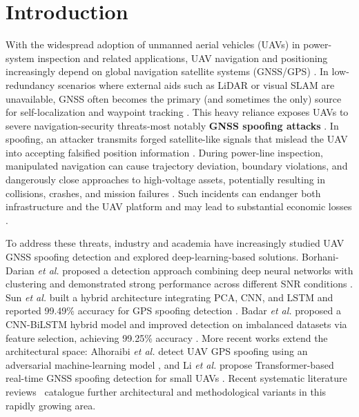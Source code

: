 \documentclass{ieeeaccess}
\begin{document}
\titlepgskip=-21pt
\maketitle

\section{Introduction}

With the widespread adoption of unmanned aerial vehicles (UAVs) in power-system inspection and related applications, UAV navigation and positioning increasingly depend on global navigation satellite systems (GNSS/GPS) \cite{ref1}. In low-redundancy scenarios where external aids such as LiDAR or visual SLAM are unavailable, GNSS often becomes the primary (and sometimes the only) source for self-localization and waypoint tracking \cite{ref2}. This heavy reliance exposes UAVs to severe navigation-security threats-most notably \textbf{GNSS spoofing attacks} \cite{ref3}. In spoofing, an attacker transmits forged satellite-like signals that mislead the UAV into accepting falsified position information \cite{ref4}. During power-line inspection, manipulated navigation can cause trajectory deviation, boundary violations, and dangerously close approaches to high-voltage assets, potentially resulting in collisions, crashes, and mission failures \cite{ref5}. Such incidents can endanger both infrastructure and the UAV platform and may lead to substantial economic losses \cite{ref6}.

To address these threats, industry and academia have increasingly studied UAV GNSS spoofing detection and explored deep-learning-based solutions. Borhani-Darian \textit{et al.} proposed a detection approach combining deep neural networks with clustering and demonstrated strong performance across different SNR conditions \cite{ref7}. Sun \textit{et al.} built a hybrid architecture integrating PCA, CNN, and LSTM and reported 99.49\% accuracy for GPS spoofing detection \cite{ref8}. Badar \textit{et al.} proposed a CNN-BiLSTM hybrid model and improved detection on imbalanced datasets via feature selection, achieving 99.25\% accuracy \cite{ref9}. More recent works extend the architectural space: Alhoraibi \textit{et al.} detect UAV GPS spoofing using an adversarial machine-learning model \cite{ref34}, and Li \textit{et al.} propose Transformer-based real-time GNSS spoofing detection for small UAVs \cite{ref35}. Recent systematic literature reviews~\cite{ref15} catalogue further architectural and methodological variants in this rapidly growing area.
\end{document}
